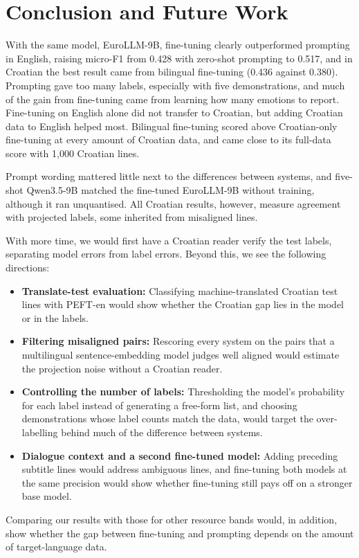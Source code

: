 \section{Conclusion and Future Work}
\label{sec:conclusion}

With the same model, EuroLLM-9B, fine-tuning clearly outperformed prompting in English, raising micro-F1 from 0.428 with zero-shot prompting to 0.517, and in Croatian the best result came from bilingual fine-tuning (0.436 against 0.380). Prompting gave too many labels, especially with five demonstrations, and much of the gain from fine-tuning came from learning how many emotions to report. Fine-tuning on English alone did not transfer to Croatian, but adding Croatian data to English helped most. Bilingual fine-tuning scored above Croatian-only fine-tuning at every amount of Croatian data, and came close to its full-data score with 1,000 Croatian lines.

Prompt wording mattered little next to the differences between systems, and five-shot Qwen3.5-9B matched the fine-tuned EuroLLM-9B without training, although it ran unquantised. All Croatian results, however, measure agreement with projected labels, some inherited from misaligned lines.

With more time, we would first have a Croatian reader verify the test labels, separating model errors from label errors. Beyond this, we see the following directions:
\begin{itemize}
    \item \textbf{Translate-test evaluation:} Classifying machine-translated Croatian test lines with PEFT-en would show whether the Croatian gap lies in the model or in the labels.
    \item \textbf{Filtering misaligned pairs:} Rescoring every system on the pairs that a multilingual sentence-embedding model judges well aligned would estimate the projection noise without a Croatian reader.
    \item \textbf{Controlling the number of labels:} Thresholding the model's probability for each label instead of generating a free-form list, and choosing demonstrations whose label counts match the data, would target the over-labelling behind much of the difference between systems.
    \item \textbf{Dialogue context and a second fine-tuned model:} Adding preceding subtitle lines would address ambiguous lines, and fine-tuning both models at the same precision would show whether fine-tuning still pays off on a stronger base model.
\end{itemize}

Comparing our results with those for other resource bands would, in addition, show whether the gap between fine-tuning and prompting depends on the amount of target-language data.

